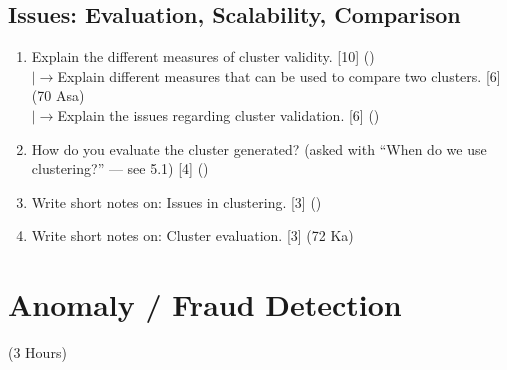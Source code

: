 \documentclass[12pt]{article}
\newcommand{\lb}{\\$\left|\rightarrow\right.$}
\begin{document}
  \subsection{Issues: Evaluation, Scalability, Comparison}
    \begin{enumerate}[topsep=0pt, noitemsep]
      \item Explain the different measures of cluster validity. \hfill [10] ()
        \lb Explain different measures that can be used to compare two clusters. \hfill [6] (70 Asa)
        \lb Explain the issues regarding cluster validation. \hfill [6] ()

      \item How do you evaluate the cluster generated? (asked with ``When do we use clustering?'' --- see 5.1) \hfill [4] ()

      \item Write short notes on: Issues in clustering. \hfill [3] ()

      \item Write short notes on: Cluster evaluation. \hfill [3] (72 Ka)
    \end{enumerate}

\pagebreak
\section{Anomaly / Fraud Detection}
\begin{center}(3 Hours)\end{center}
\end{document}
